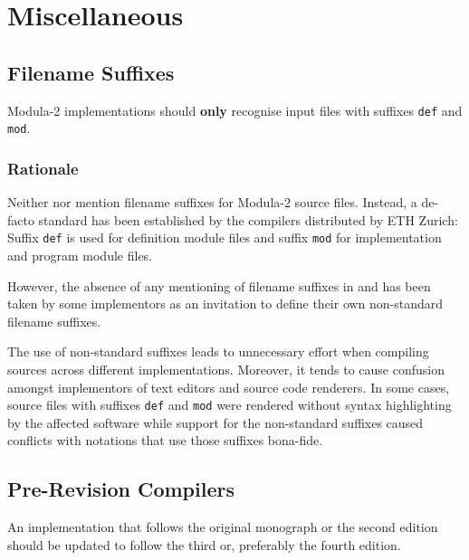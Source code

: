 \documentclass[10pt,a4paper]{article} %
\begin{document}
\section{Miscellaneous}

\subsection{Filename Suffixes}

Modula-2 implementations should \textbf{only} recognise input files with suffixes \verb|def| and \verb|mod|.

\subsubsection{Rationale}

Neither \cite{Wirth78} nor \cite{Wirth88} mention filename suffixes for Modula-2 source files. Instead, a de-facto standard has been established by the compilers distributed by ETH Zurich: Suffix \verb|def| is used for definition module files and suffix \verb|mod| for implementation and program module files.

However, the absence of any mentioning of filename suffixes in \cite{Wirth78} and \cite{Wirth88} has been taken by some implementors as an invitation to define their own non-standard filename suffixes.

The use of non-standard suffixes leads to unnecessary effort when compiling sources across different implementations. Moreover, it tends to cause confusion amongst implementors of text editors and source code renderers. In some cases, source files with suffixes \verb|def| and \verb|mod| were rendered without syntax highlighting by the affected software while support for the non-standard suffixes caused conflicts with notations that use those suffixes bona-fide.


\subsection{Pre-Revision Compilers}
An implementation that follows the original monograph \cite{Wirth78} or the second edition \cite{Wirth83} should be updated to follow the third \cite{Wirth85} or, preferably the fourth \cite{Wirth88} edition.
\end{document}
